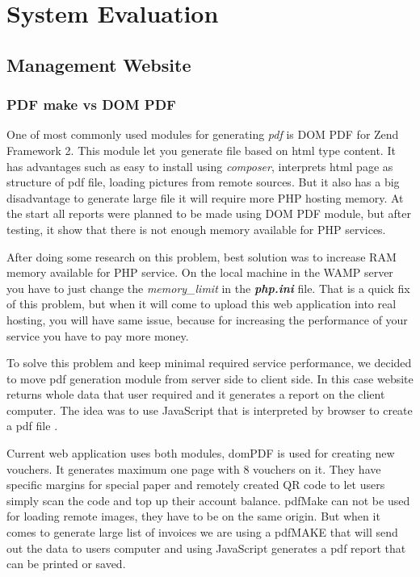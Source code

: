 


\chapter{System Evaluation}	%
\section{Management Website}
	\subsection{PDF make vs DOM PDF}
		One of most commonly used modules for generating \textit{pdf} is DOM PDF for Zend Framework 2. This module let you generate file based on html type content. It has advantages such as easy to install using \textit{composer}, interprets html page as structure of pdf file, loading pictures from remote sources. But it also has a big disadvantage to generate large file it will require more PHP hosting memory. 
		At the start all reports were planned to be made using DOM PDF module, but after testing, it show that there is not enough memory available for PHP services. 
		
		After doing some research on this problem, best solution was to increase RAM memory available for PHP service. On the local machine in the WAMP server you have to just change the \textit{memory\_limit} in the \textit{\textbf{php.ini}} file. That is a quick fix of this problem, but when it will come to upload this web application into real hosting, you will have same issue, because for increasing the  performance of your service you have to pay more money.
		
		To solve this problem and keep minimal required service performance, we decided to move pdf generation module from server side to client side. In this case website returns whole data that user required and it generates a report on the client computer. The idea was to use JavaScript that is interpreted by browser to create a pdf file \cite{PDF_Make_module}.
		
		Current web application uses both modules, domPDF is used for creating new vouchers. It generates maximum one page with 8 vouchers on it. They have specific margins for special paper and remotely created QR code to let users simply scan the code and top up their account balance. pdfMake can not be used for loading remote images, they have to be on the same origin. But when it comes to generate large list of invoices we are using a pdfMAKE that will send out the data to users computer and using JavaScript generates a pdf report that can be printed or saved.
	
